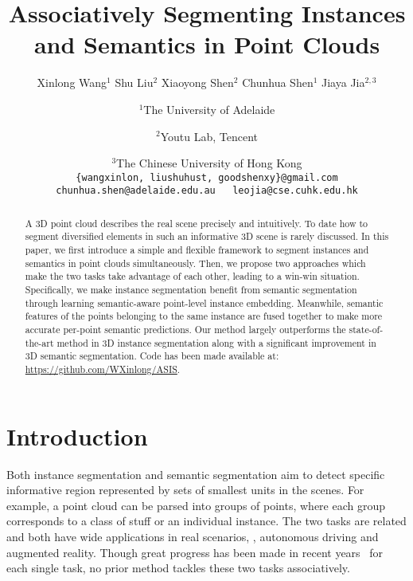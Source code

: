 \documentclass[10pt,twocolumn,letterpaper]{article}
\begin{document}
\title{Associatively Segmenting Instances and Semantics in Point Clouds}

\author{Xinlong Wang$^{1}$ \quad Shu Liu$^2$ \quad Xiaoyong Shen$^2$ \quad Chunhua Shen$^1$ \quad Jiaya Jia$^{2,3}$ \\
\and 
$^1$The University of Adelaide\\
\and
$^2$Youtu Lab, Tencent\\
\and
$^3$The Chinese University of Hong Kong\\
{\tt\small  \{wangxinlon, liushuhust, goodshenxy\}@gmail.com}\\
{\tt\small chunhua.shen@adelaide.edu.au~~ leojia@cse.cuhk.edu.hk}\\
}

\maketitle


\begin{abstract}
  A 3D point cloud describes the real scene precisely and intuitively.
  To date how to segment diversified elements in such an informative 3D scene is rarely discussed. 
  In this paper, we first introduce a simple and flexible framework to segment instances and semantics in point clouds simultaneously.
  Then, we propose two approaches which make the two tasks take advantage of each other, leading to a win-win situation.
  Specifically, we make instance segmentation benefit from semantic segmentation through learning semantic-aware point-level instance embedding.
  Meanwhile, semantic features of the points belonging to the same instance are fused together to make more accurate per-point semantic predictions. 
  Our method largely outperforms the state-of-the-art method in 3D instance segmentation along with a significant improvement in 3D semantic segmentation.
  Code has been made available at: 
  \href{https://github.com/WXinlong/ASIS}{https://github.com/WXinlong/ASIS}.


\end{abstract}




\section{Introduction}

Both instance segmentation and semantic segmentation aim to detect specific informative region represented by sets of smallest units in the scenes.
For example, a point cloud can be parsed into groups of points, where each group corresponds to a class of stuff or an individual instance.
The two tasks are related and both have wide applications in real scenarios, \eg, autonomous driving and augmented reality.
Though great progress has been made in recent years~\cite{he2017mask,de2017semantic,long2015fully,tchapmi2017segcloud,Landrieu_2018_CVPR} for each single task, no prior method tackles these two tasks associatively.
\end{document}
